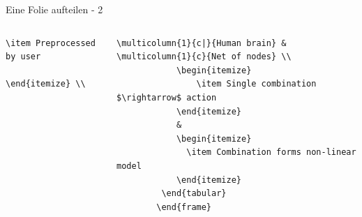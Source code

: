 \documentclass{beamer}
\begin{document}
\begin{frame}[containsverbatim]{Eine Folie aufteilen - 2}
\begin{columns}
\begin{column}{0.5\textwidth}
\begin{lstlisting}[basicstyle=\fontsize{8}{9}\selectfont]
              \item Preprocessed by user
            \end{itemize} \\
            \end{lstlisting}
        \end{column}    
        \begin{column}{0.5\textwidth}
            \begin{lstlisting}[basicstyle=\fontsize{8}{9}\selectfont]
                    \multicolumn{1}{c|}{Human brain} & \multicolumn{1}{c}{Net of nodes} \\
            \begin{itemize}
                \item Single combination $\rightarrow$ action
            \end{itemize}
            & 
            \begin{itemize}
              \item Combination forms non-linear model
            \end{itemize} 
         \end{tabular}
        \end{frame}
            \end{lstlisting}
        \end{column}    
    \end{columns}
\end{frame}
\end{document}
